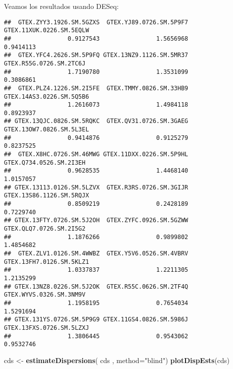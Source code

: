 \documentclass[
]{article}
\newenvironment{Shaded}{\begin{snugshade}}{\end{snugshade}}
\newcommand{\DataTypeTok}[1]{\textcolor[rgb]{0.13,0.29,0.53}{#1}}
\newcommand{\KeywordTok}[1]{\textcolor[rgb]{0.13,0.29,0.53}{\textbf{#1}}}
\newcommand{\NormalTok}[1]{#1}
\newcommand{\OperatorTok}[1]{\textcolor[rgb]{0.81,0.36,0.00}{\textbf{#1}}}
\newcommand{\StringTok}[1]{\textcolor[rgb]{0.31,0.60,0.02}{#1}}
\begin{document}
Veamos los resultados usando DESeq:

\begin{Shaded}
\end{Shaded}

\begin{verbatim}
##  GTEX.ZYY3.1926.SM.5GZXS  GTEX.YJ89.0726.SM.5P9F7 GTEX.11XUK.0226.SM.5EQLW 
##                0.9127543                1.5656968                0.9414113 
##  GTEX.YFC4.2626.SM.5P9FQ GTEX.13NZ9.1126.SM.5MR37  GTEX.R55G.0726.SM.2TC6J 
##                1.7190780                1.3531099                0.3086861 
##  GTEX.PLZ4.1226.SM.2I5FE  GTEX.TMMY.0826.SM.33HB9 GTEX.14AS3.0226.SM.5Q5B6 
##                1.2616073                1.4984118                0.8923937 
## GTEX.13QJC.0826.SM.5RQKC  GTEX.QV31.0726.SM.3GAEG GTEX.13OW7.0826.SM.5L3EL 
##                0.9414876                0.9125279                0.8237525 
##  GTEX.X8HC.0726.SM.46MWG GTEX.11DXX.0226.SM.5P9HL  GTEX.Q734.0526.SM.2I3EH 
##                0.9628535                1.4468140                1.0157057 
## GTEX.13113.0126.SM.5LZVX  GTEX.R3RS.0726.SM.3GIJR GTEX.13S86.1126.SM.5RQJX 
##                0.8509219                0.2428189                0.7229740 
## GTEX.13FTY.0726.SM.5J2OH  GTEX.ZYFC.0926.SM.5GZWW  GTEX.QLQ7.0726.SM.2I5G2 
##                1.1876266                0.9899802                1.4854682 
##  GTEX.ZLV1.0126.SM.4WWBZ  GTEX.Y5V6.0526.SM.4VBRV GTEX.13FH7.0126.SM.5KLZ1 
##                1.0337837                1.2211305                1.2135299 
## GTEX.13NZ8.0226.SM.5J2OK  GTEX.R55C.0626.SM.2TF4Q  GTEX.WYVS.0326.SM.3NM9V 
##                1.1958195                0.7654034                1.5291694 
## GTEX.131YS.0726.SM.5P9G9 GTEX.11GS4.0826.SM.5986J GTEX.13FXS.0726.SM.5LZXJ 
##                1.3806445                0.9543062                0.9532746
\end{verbatim}

\begin{Shaded}
\begin{Highlighting}[]
\NormalTok{cds <-}\StringTok{ }\KeywordTok{estimateDispersions}\NormalTok{( cds , }\DataTypeTok{method=}\StringTok{"blind"}\NormalTok{)}
\KeywordTok{plotDispEsts}\NormalTok{(cds)}
\end{Highlighting}
\end{Shaded}
\end{document}
